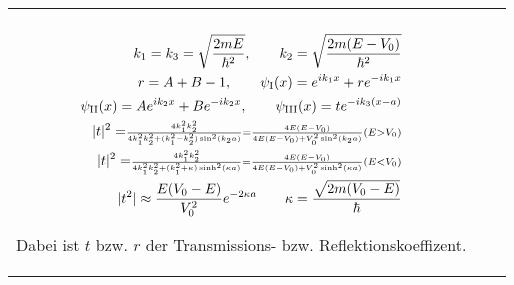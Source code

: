 \documentclass[landscape,8pt]{scrartcl}
\newcommand{\myheading}[1]{\noindent\textbf{#1}\\}
\begin{document}
\begin{tabular}{lll}
\begin{minipage}{0.3\linewidth}
\myheading{Potentialbarriere}
{\begin{align*}
k_1 = k_3 = \sqrt{\frac{2mE}{\hbar^2}}, \qquad k_2 = \sqrt{\frac{2m(E-V_0)}{\hbar^2}} \\
r = A+B-1, \qquad \psi_\text I(x) = e^{ik_1x} + re^{-ik_1x} \\
\psi_\text{II}(x) = Ae^{ik_2x} + Be^{-ik_2x}, \qquad \psi_\text{III}(x) = t e^{-ik_3(x-a)} \\
|t|^2 = \scriptstyle{\frac{4k_1^2k_2^2}{4k_1^2k_2^2+(k_1^2-k_2^2)\sin^2(k_2a)}=\frac{4E(E-V_0)}{4E(E-V_0)+V_0^2\sin^2(k_2a)}} (E>V_0)\\
|t|^2 = \scriptstyle{\frac{4k_1^2k_2^2}{4k_1^2k_2^2+(k_1^2+\kappa)\sinh^2(\kappa a)}=\frac{4E(E-V_0)}{4E(E-V_0)+V_0^2\sinh^2(\kappa a)}} (E<V_0)\\
|t^2| \approx \frac{E(V_0 - E)}{V_0^2}e^{-2\kappa a} \qquad \kappa = \frac{\sqrt{2m(V_0 - E)}}{\hbar}
\end{align*}}

Dabei ist $t$ bzw. $r$ der Transmissions- bzw. Reflektionskoeffizent. 

\end{minipage}
\end{tabular}

\newpage
\end{document}

